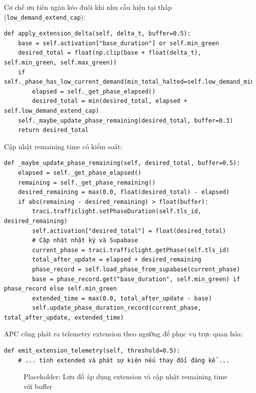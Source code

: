 \documentclass[12pt,a4paper,oneside]{report}
\begin{document}
Cơ chế ưu tiên ngăn kéo đuôi khi nhu cầu hiện tại thấp (\texttt{low\_demand\_extend\_cap}):
\begin{lstlisting}[style=py, caption={Áp dụng extension tương ứng với delta-t}, label={lst:apply_ext}]
def apply_extension_delta(self, delta_t, buffer=0.5):
    base = self.activation["base_duration"] or self.min_green
    desired_total = float(np.clip(base + float(delta_t), self.min_green, self.max_green))
    if self._phase_has_low_current_demand(min_total_halted=self.low_demand_min_halted):
        elapsed = self._get_phase_elapsed()
        desired_total = min(desired_total, elapsed + self.low_demand_extend_cap)
    self._maybe_update_phase_remaining(desired_total, buffer=0.3)
    return desired_total
\end{lstlisting}

Cập nhật remaining time có kiểm soát:
\begin{lstlisting}[style=py, caption={Cập nhật remaining time an toàn}, label={lst:update_remaining}]
def _maybe_update_phase_remaining(self, desired_total, buffer=0.5):
    elapsed = self._get_phase_elapsed()
    remaining = self._get_phase_remaining()
    desired_remaining = max(0.0, float(desired_total) - elapsed)
    if abs(remaining - desired_remaining) > float(buffer):
        traci.trafficlight.setPhaseDuration(self.tls_id, desired_remaining)
        self.activation["desired_total"] = float(desired_total)
        # Cập nhật nhật ký và Supabase
        current_phase = traci.trafficlight.getPhase(self.tls_id)
        total_after_update = elapsed + desired_remaining
        phase_record = self.load_phase_from_supabase(current_phase)
        base = phase_record.get("base_duration", self.min_green) if phase_record else self.min_green
        extended_time = max(0.0, total_after_update - base)
        self.update_phase_duration_record(current_phase, total_after_update, extended_time)
\end{lstlisting}

\noindent APC cũng phát ra telemetry extension theo ngưỡng để phục vụ trực quan hóa:
\begin{lstlisting}[style=py, caption={Telemetry extension ngưỡng 0.5s}]
def emit_extension_telemetry(self, threshold=0.5):
    # ... tính extended và phát sự kiện nếu thay đổi đáng kể ...
\end{lstlisting}

\begin{figure}[H]
    \centering
    \fbox{\rule[0pt]{0pt}{0.35\textwidth}\rule[0.8\textwidth]{0pt}{0pt}}
    \caption{Placeholder: Lưu đồ áp dụng extension và cập nhật remaining time với buffer}
    \label{fig:extension_flow}
\end{figure}
\end{document}

